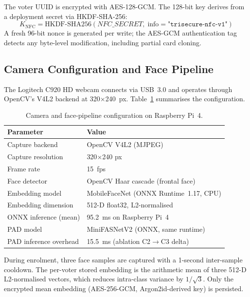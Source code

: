 \documentclass[submission]{sacjsub}
\begin{document}
The voter UUID is encrypted with AES-128-GCM. The 128-bit key derives
from a deployment secret via HKDF-SHA-256:
\begin{equation}
  K_{\mathrm{NFC}} = \mathrm{HKDF\text{-}SHA256}(\mathit{NFC\_SECRET},\;
    \text{info}{=}\texttt{"trisecure-nfc-v1"})
\end{equation}
A fresh 96-bit nonce is generated per write; the AES-GCM authentication
tag detects any byte-level modification, including partial card cloning.

\subsection{Camera Configuration and Face Pipeline}

The Logitech C920 HD webcam connects via USB~3.0 and operates through
OpenCV's V4L2 backend at 320$\times$240~px. Table~\ref{tab:camera_config}
summarises the configuration.

\begin{table}[t]
\caption{Camera and face-pipeline configuration on Raspberry Pi~4.}
\label{tab:camera_config}
\begin{tabular}{|l|l|}
  \hline
  Parameter & Value \\
  \hline
  Capture backend         & OpenCV V4L2 (MJPEG) \\
  Capture resolution      & 320$\times$240 px \\
  Frame rate              & 15~fps \\
  Face detector           & OpenCV Haar cascade (frontal face) \\
  Embedding model         & MobileFaceNet (ONNX Runtime~1.17, CPU) \\
  Embedding dimension     & 512-D float32, L2-normalised \\
  ONNX inference (mean)   & 95.2~ms on Raspberry Pi~4 \\
  PAD model               & MiniFASNetV2 (ONNX, same runtime) \\
  PAD inference overhead  & 15.5~ms (ablation C2$\to$C3 delta) \\
  \hline
\end{tabular}
\end{table}

During enrolment, three face samples are captured with a 1-second
inter-sample cooldown. The per-voter stored embedding is the arithmetic
mean of three 512-D L2-normalised vectors, which reduces intra-class
variance by \(1/\sqrt{3}\). Only the encrypted mean embedding
(AES-256-GCM, Argon2id-derived key) is persisted.
\end{document}
